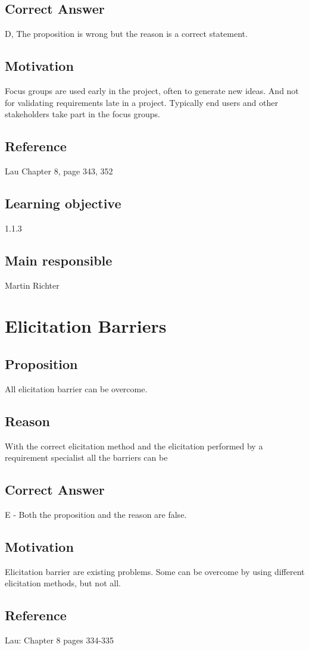 \documentclass[a4paper]{article}
\begin{document}
\subsection*{Correct Answer}
D, The proposition is wrong but the reason is a correct statement.
\subsection*{Motivation}
Focus groups are used early in the project, often to generate new ideas. And not for validating requirements late in a project. Typically end users and other stakeholders take part in the focus groups.
\subsection*{Reference}
Lau Chapter 8, page 343, 352
\subsection*{Learning objective}
1.1.3
\subsection*{Main responsible}
Martin Richter


\section{Elicitation Barriers}
\subsection*{Proposition}
All elicitation barrier can be overcome.
\subsection*{Reason}
With the correct elicitation method and the elicitation performed by a requirement specialist all the barriers can be 
\subsection*{Correct Answer}
E - Both the proposition and the reason are false.
\subsection*{Motivation}
Elicitation barrier are existing problems. Some can be overcome by using different elicitation methods, but not all.
\subsection*{Reference}
Lau: Chapter 8 pages 334-335
\end{document}
